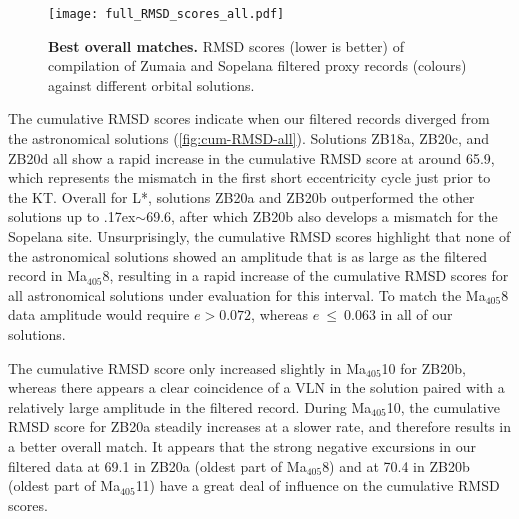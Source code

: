 \documentclass[draft]{agujournal2019}
\newcommand{\appr}{\raise.17ex\hbox{\(\scriptstyle\sim\)}} %
\newcommand{\ma}[1]{Ma\(_{405}\)#1} %
\newcommand{\rez}{\textcolor{magenta}}
\newcommand{\ijk}{\textcolor{blue}}
\begin{document}
\begin{figure}
    \centering
    \texttt{[image: full\_RMSD\_scores\_all.pdf]}
    \caption{\label{fig:full-RMSD-all} %
      \textbf{Best overall matches.}
        \Acrfull{RMSD} scores (lower is better) of compilation of Zumaia and Sopelana filtered proxy records (colours) against different orbital solutions.
    }
\end{figure}

The cumulative \gls{RMSD} scores indicate when our filtered records diverged from the astronomical solutions (\cref{fig:cum-RMSD-all}).
Solutions ZB18a, ZB20c, and ZB20d all show a rapid increase in the cumulative \gls{RMSD} score at around \qty{65.9}{\millionyearago}, which represents the mismatch in the first short eccentricity cycle just prior to the \gls{KT}.
Overall for \gls{L*}, solutions ZB20a and ZB20b outperformed the other solutions up to \appr\qty{69.6}{\millionyearago}, after which ZB20b also develops a mismatch for the Sopelana site.
Unsurprisingly, the cumulative \gls{RMSD} scores highlight that none of the astronomical solutions showed an amplitude that is as large as the filtered record in \ma{8}, resulting in a rapid increase of the cumulative \gls{RMSD} scores for all astronomical solutions under evaluation for this interval.
To match the \ma{8} data amplitude would require $e > 0.072$,
whereas $e~\le~0.063$ in all of our solutions.

The cumulative \gls{RMSD} score only increased slightly in \ma{10} for ZB20b, whereas there appears a clear coincidence of a \gls{VLN} in the solution paired with a relatively large amplitude in the filtered record.
During \ma{10}, the cumulative \gls{RMSD} score for ZB20a steadily increases at a slower rate, and therefore results in a better overall match.
It appears that the strong negative excursions in our filtered data
at \qty{69.1}{\millionyearago} in ZB20a (oldest part of \ma{8})
and at \qty{70.4}{\millionyearago} in ZB20b (oldest part of \ma{11})
have a great deal of influence on the cumulative \gls{RMSD} scores.
\end{document}
